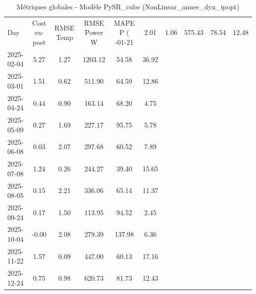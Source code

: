 \begin{table}
\caption{Métriques globales - Modèle PySR_cube (NonLinear_annee_dyn_ipopt)}
\label{tab:PySR_cube_NonLinear_annee_dyn_ipopt_Validation_EPlus_sans_Opti}
\begin{small}
\begin{tabular}{lccccc}
\toprule
Day & Cost ex-post & RMSE Temp & RMSE Power W & MAPE P (%
-01-21 & 2.01 & 1.06 & 575.43 & 78.54 & 12.48 \\
2025-02-04 & 5.27 & 1.27 & 1203.12 & 54.58 & 36.92 \\
2025-03-01 & 1.51 & 0.62 & 511.90 & 64.59 & 12.86 \\
2025-04-24 & 0.44 & 0.90 & 163.14 & 68.20 & 4.75 \\
2025-05-09 & 0.27 & 1.69 & 227.17 & 95.75 & 5.78 \\
2025-06-08 & 0.03 & 2.07 & 297.68 & 60.52 & 7.89 \\
2025-07-08 & 1.24 & 0.26 & 244.27 & 39.40 & 15.65 \\
2025-08-05 & 0.15 & 2.21 & 336.06 & 65.14 & 11.37 \\
2025-09-24 & 0.17 & 1.50 & 113.95 & 94.52 & 2.45 \\
2025-10-04 & -0.00 & 2.08 & 279.39 & 137.98 & 6.36 \\
2025-11-22 & 1.57 & 0.09 & 447.00 & 60.13 & 17.16 \\
2025-12-24 & 0.75 & 0.98 & 620.73 & 81.73 & 12.43 \\
\bottomrule
\end{tabular}
\end{small}
\end{table}
